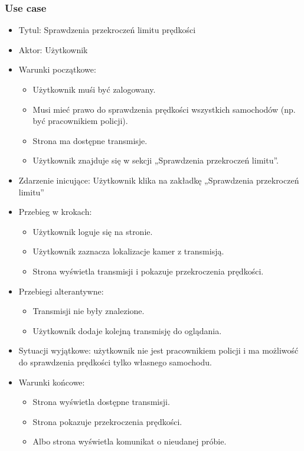\documentclass[12pt]{article}
\begin{document}
\subsubsection{Use case}
\begin{itemize}
\item Tytul: Sprawdzenia przekroczeń limitu prędkości
\item Aktor: Użytkownik
\item Warunki początkowe: 
	\begin{itemize}
	\item Użytkownik muśi być zalogowany.
	\item Musi mieć prawo do sprawdzenia prędkości wszystkich samochodów (np. być pracownikiem policji).
	\item Strona ma dostępne transmisje.
	\item Użytkownik znajduje się w sekcji „Sprawdzenia przekroczeń limitu”.
	\end{itemize}
\item Zdarzenie inicujące: Użytkownik klika na zakładkę „Sprawdzenia przekroczeń limitu”
\item Przebieg w krokach:
	\begin{itemize}
	\item Użytkownik loguje się na stronie.
	\item Użytkownik zaznacza lokalizacje kamer z transmisją.
	\item Strona wyświetla transmisji i pokazuje przekroczenia prędkości.
	\end{itemize}
\item Przebiegi alterantywne: 
	\begin{itemize}
	\item Transmisji nie były znalezione.
	\item Użytkownik dodaje kolejną transmisję do oglądania.
	\end{itemize}
\item Sytuacji wyjątkowe: użytkownik nie jest pracownikiem policji i ma możliwość do sprawdzenia prędkości tylko własnego samochodu.
\item Warunki końcowe:
	\begin{itemize}
	\item Strona wyświetla dostępne transmisji.
	\item Strona pokazuje przekroczenia prędkości.
	\item Albo strona wyświetla komunikat o nieudanej próbie.
	\end{itemize}
\end{itemize}
\end{document}
